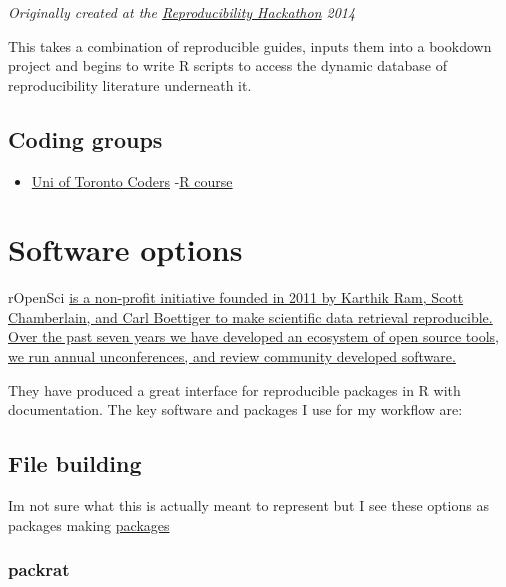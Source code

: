 \documentclass[
]{book}
\providecommand{\tightlist}{%
  \setlength{\itemsep}{0pt}\setlength{\parskip}{0pt}}
\theoremstyle{definition}
\theoremstyle{definition}
\theoremstyle{definition}
\theoremstyle{definition}
\theoremstyle{remark}
\begin{document}
\emph{Originally created at the \href{https://github.com/Reproducible-Science-Curriculum/Reproducible-Science-Hackathon-Dec-08-2014}{Reproducibility Hackathon} 2014}

This takes a combination of reproducible guides, inputs them into a bookdown project and begins to write R scripts to access the dynamic database of reproducibility literature underneath it.

\hypertarget{coding-groups-1}{%
\section{Coding groups}\label{coding-groups-1}}

\begin{itemize}
\tightlist
\item
  \href{https://github.com/UofTCoders}{Uni of Toronto Coders}
  -\href{https://github.com/UofTCoders/rcourse}{R course}
\end{itemize}

\hypertarget{software-options}{%
\chapter{Software options}\label{software-options}}

rOpenSci \href{https://ropensci.org/about/}{is a non-profit initiative founded in 2011 by Karthik Ram, Scott Chamberlain, and Carl Boettiger to make scientific data retrieval reproducible. Over the past seven years we have developed an ecosystem of open source tools, we run annual unconferences, and review community developed software.}

They have produced a great interface for reproducible packages in R with documentation. The key software and packages I use for my workflow are:

\hypertarget{file-building}{%
\section{File building}\label{file-building}}

Im not sure what this is actually meant to represent but I see these options as packages making \href{https://wlandau.github.io/2016/06/14/workflow/}{packages}

\hypertarget{packrat}{%
\subsection{packrat}\label{packrat}}
\end{document}

